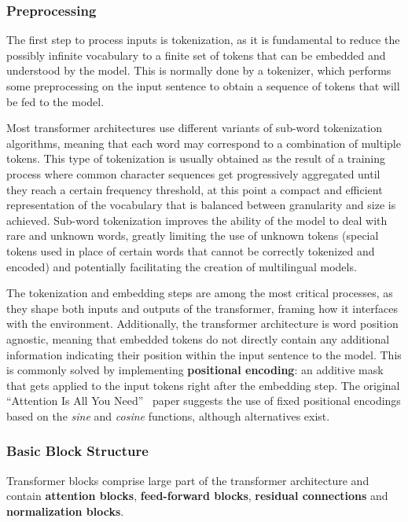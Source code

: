 \subsubsection*{Preprocessing}

The first step to process inputs is tokenization, as it is fundamental to reduce the possibly infinite vocabulary to a finite set of tokens that can be embedded and understood by the model.
This is normally done by a tokenizer, which performs some preprocessing on the input sentence to obtain a sequence of tokens that will be fed to the model.

Most transformer architectures use different variants of sub-word tokenization algorithms, meaning that each word may correspond to a combination of multiple tokens.
This type of tokenization is usually obtained as the result of a training process where common character sequences get progressively aggregated until they reach a certain frequency threshold, at this point a compact and efficient representation of the vocabulary that is balanced between granularity and size is achieved.
Sub-word tokenization improves the ability of the model to deal with rare and unknown words, greatly limiting the use of unknown tokens (special tokens used in place of certain words that cannot be correctly tokenized and encoded) and potentially facilitating the creation of multilingual models.

The tokenization and embedding steps are among the most critical processes, as they shape both inputs and outputs of the transformer, framing how it interfaces with the environment.
Additionally, the transformer architecture is word position agnostic, meaning that embedded tokens do not directly contain any additional information indicating their position within the input sentence to the model.
This is commonly solved by implementing \textbf{positional encoding}: an additive mask that gets applied to the input tokens right after the embedding step.
The original ``Attention Is All You Need''~\cite{vaswani2017} paper suggests the use of fixed positional encodings based on the \emph{sine} and \emph{cosine} functions, although alternatives exist.

\subsubsection*{Basic Block Structure}

Transformer blocks comprise large part of the transformer architecture and contain \textbf{attention blocks}, \textbf{feed-forward blocks}, \textbf{residual connections} and \textbf{normalization blocks}.

